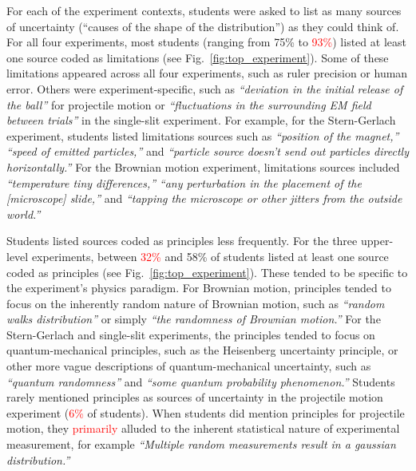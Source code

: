 \documentclass[english,aps,prstper,reprint,showpacs,longbibliography,superscriptaddress,nofootinbib]{revtex4-2}
\begin{document}
For each of the experiment contexts, students were asked to list as many sources of uncertainty (``causes of the shape of the distribution'') as they could think of. %
For all four experiments, most students (ranging from 75\% to \textcolor{red}{93\%}) listed at least one source coded as limitations (see Fig.~\ref{fig:top_experiment}). Some of these limitations appeared across all four experiments, such as ruler precision or human error. Others were experiment-specific, such as \textit{``deviation in the initial release of the ball''} for projectile motion or \textit{``fluctuations in the surrounding EM field between trials''} in the single-slit experiment. For example, for the Stern-Gerlach experiment, students listed limitations sources such as \textit{``position of the magnet,''} \textit{``speed of emitted particles,''} and \textit{``particle source doesn't send out particles directly horizontally.''} For the Brownian motion experiment, limitations sources included \textit{``temperature tiny differences,''} \textit{``any perturbation in the placement of the [microscope] slide,''} and \textit{``tapping the microscope or other jitters from the outside world.''}

Students listed sources coded as principles less frequently. For the three upper-level experiments, between \textcolor{red}{32\%} and 58\% of students listed at least one source coded as principles (see Fig.~\ref{fig:top_experiment}). These tended to be specific to the experiment's physics paradigm. For Brownian motion, principles tended to focus on the inherently random nature of Brownian motion, such as \textit{``random walks distribution''} or simply \textit{``the randomness of Brownian motion.''} For the Stern-Gerlach and single-slit experiments, the principles tended to focus on quantum-mechanical principles, such as the Heisenberg uncertainty principle, or other more vague descriptions of quantum-mechanical uncertainty, such as \textit{``quantum randomness''} and \textit{``some quantum probability phenomenon.''} Students rarely mentioned principles as sources of uncertainty in the projectile motion experiment (\textcolor{red}{6\%} of students). When students did mention principles for projectile motion, they \textcolor{red}{primarily} alluded to the inherent statistical nature of experimental measurement, for example \textit{``Multiple random measurements result in a gaussian distribution.''}
\end{document}
